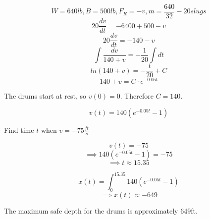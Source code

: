 \documentclass{article}
\begin{document}
\[W = 640lb, B = 500lb, F_R = -v, m = \frac{640}{32} - 20 slugs\]
\[20 \frac{dv}{dt} = -6400 + 500 - v\]
\[20 \frac{dv}{dt} = -140 - v\]
\[\int \frac{dv}{140 + v} = -\frac{1}{20} \int dt\]
\[ln(140+v) = -\frac{t}{20} + C\]
\[140 + v = C \cdot e^{-0.05t}\]

The drums start at rest, so $v(0) = 0$. Therefore
$C = 140$.

\[v(t) = 140(e^{-0.05t} - 1)\]


Find time $t$ when $v = -75 \frac{ft}{s}$

\[v(t) = -75\]
\[\implies 140(e^{-0.05t} - 1) = -75\]
\[\implies t \approx 15.35\]

\[x(t) = \int_{0}^{15.35} 140(e^{-0.05t} - 1)\]
\[\implies x(t) \approx -649\]


The maximum safe depth for the drums is approximately 649ft.
\end{document}
